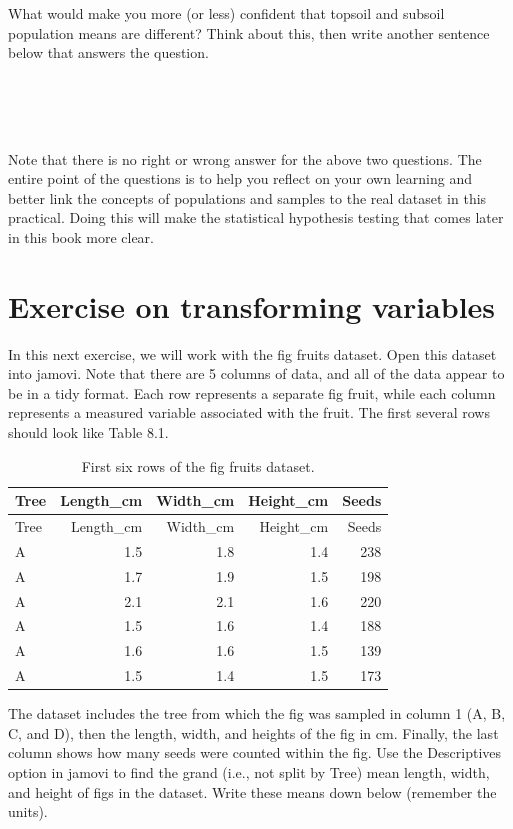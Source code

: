 \documentclass[
  openany]{scrbook}
\begin{document}
What would make you more (or less) confident that topsoil and subsoil population means are different?
Think about this, then write another sentence below that answers the question.

\begin{verbatim}




\end{verbatim}

Note that there is no right or wrong answer for the above two questions.
The entire point of the questions is to help you reflect on your own learning and better link the concepts of populations and samples to the real dataset in this practical.
Doing this will make the statistical hypothesis testing that comes later in this book more clear.

\hypertarget{transforming_variables_02}{%
\section{Exercise on transforming variables}\label{transforming_variables_02}}

In this next exercise, we will work with the fig fruits dataset.
Open this dataset into jamovi.
Note that there are 5 columns of data, and all of the data appear to be in a tidy format.
Each row represents a separate fig fruit, while each column represents a measured variable associated with the fruit.
The first several rows should look like Table 8.1.

\begin{longtable}[]{@{}lrrrr@{}}
\caption{\label{tab:unnamed-chunk-28}First six rows of the fig fruits dataset.}\tabularnewline
\toprule
Tree & Length\_cm & Width\_cm & Height\_cm & Seeds \\
\midrule
\endfirsthead
\toprule
Tree & Length\_cm & Width\_cm & Height\_cm & Seeds \\
\midrule
\endhead
A & 1.5 & 1.8 & 1.4 & 238 \\
A & 1.7 & 1.9 & 1.5 & 198 \\
A & 2.1 & 2.1 & 1.6 & 220 \\
A & 1.5 & 1.6 & 1.4 & 188 \\
A & 1.6 & 1.6 & 1.5 & 139 \\
A & 1.5 & 1.4 & 1.5 & 173 \\
\bottomrule
\end{longtable}

The dataset includes the tree from which the fig was sampled in column 1 (A, B, C, and D), then the length, width, and heights of the fig in cm.
Finally, the last column shows how many seeds were counted within the fig.
Use the Descriptives option in jamovi to find the grand (i.e., not split by Tree) mean length, width, and height of figs in the dataset.
Write these means down below (remember the units).
\end{document}
